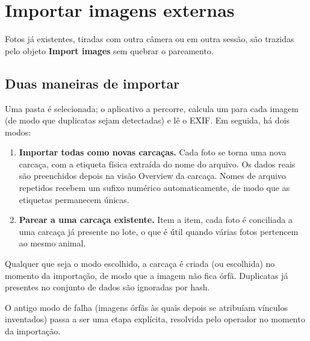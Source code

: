 \chapter{Importar imagens externas}


\vspace{4pt}
Fotos já existentes, tiradas com outra câmera ou em outra sessão, são trazidas
pelo objeto \textbf{Import images} sem quebrar o pareamento.

\section{Duas maneiras de importar}

Uma pasta é selecionada; o aplicativo a percorre, calcula um  para cada
imagem (de modo que duplicatas sejam detectadas) e lê o EXIF. Em seguida, há dois
modos:

\begin{enumerate}[leftmargin=1.4em,itemsep=4pt]
  \item \textbf{Importar todas como novas carcaças.} Cada foto se torna
        uma nova carcaça, com a etiqueta física extraída do nome do arquivo. Os dados
        reais são preenchidos depois na visão Overview da carcaça. Nomes de arquivo
        repetidos recebem um sufixo numérico automaticamente, de modo que as etiquetas
        permanecem únicas.
  \item \textbf{Parear a uma carcaça existente.} Item a item, cada foto é conciliada a
        uma carcaça já presente no lote, o que é útil quando várias fotos pertencem ao
        mesmo animal.
\end{enumerate}

\begin{note}[title={O pareamento é preservado em ambos os modos}]
Qualquer que seja o modo escolhido, a carcaça é criada (ou escolhida) no momento da
importação, de modo que a imagem não fica órfã. Duplicatas já presentes no conjunto de
dados são ignoradas por hash.
\end{note}

O antigo modo de falha (imagens órfãs às quais depois se atribuíam vínculos
inventados) passa a ser uma etapa explícita, resolvida pelo operador no momento da
importação.
